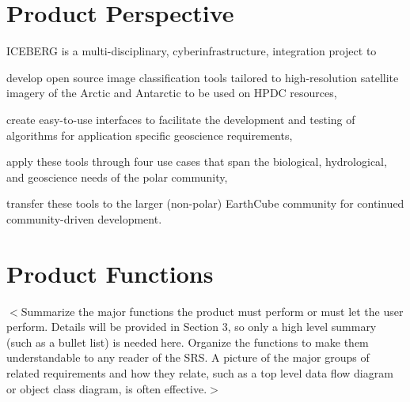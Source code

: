 \documentclass{scrreprt}
\begin{document}
\section{Product Perspective}
\iffalse
$<$Describe the context and origin of the product being specified in this SRS.  
For example, state whether this product is a follow-on member of a product 
family, a replacement for certain existing systems, or a new, self-contained 
product. If the SRS defines a component of a larger system, relate the 
requirements of the larger system to the functionality of this software and 
identify interfaces between the two. A simple diagram that shows the major 
components of the overall system, subsystem interconnections, and external 
interfaces can be helpful.$>$
\fi
ICEBERG is a multi-disciplinary, cyberinfrastructure, integration project to 
\begin{inparaenum}[(1)]
	\item develop open source image classification tools tailored to high-resolution 
	satellite imagery of the Arctic and Antarctic to be used on HPDC resources,
	\item create easy-to-use interfaces to facilitate the development and testing 
	of algorithms for application specific geoscience requirements,
	\item apply these tools through four use cases that span the biological, 
	hydrological, and geoscience needs of the polar community,
	\item transfer these tools to the larger (non-polar) EarthCube community for 
	continued community-driven development.
\end{inparaenum}

\section{Product Functions}
$<$Summarize the major functions the product must perform or must let the user 
perform. Details will be provided in Section 3, so only a high level summary 
(such as a bullet list) is needed here. Organize the functions to make them 
understandable to any reader of the SRS. A picture of the major groups of 
related requirements and how they relate, such as a top level data flow diagram 
or object class diagram, is often effective.$>$
\end{document}
